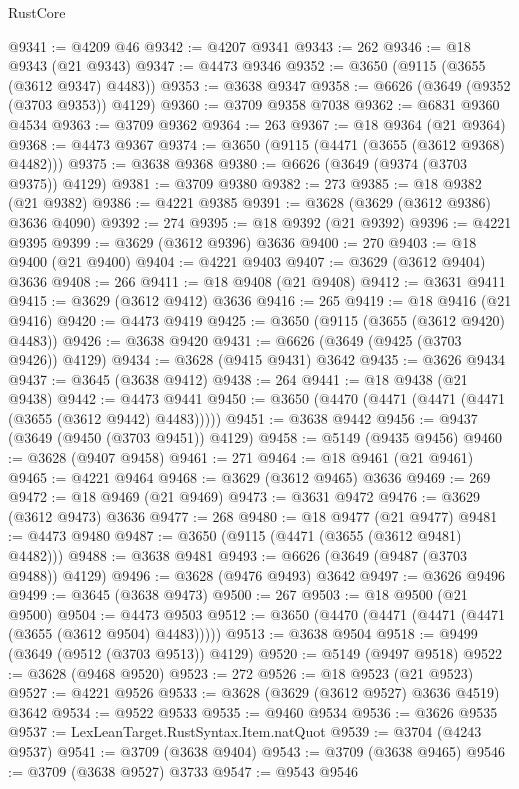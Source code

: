 \begin{lexlean}{RustCore}
\begin{coremodule}
@9341 := @4209 @46
@9342 := @4207 @9341
@9343 := 262
@9346 := @18 @9343 (@21 @9343)
@9347 := @4473 @9346
@9352 := @3650 (@9115 (@3655 (@3612 @9347) @4483))
@9353 := @3638 @9347
@9358 := @6626 (@3649 (@9352 (@3703 @9353)) @4129)
@9360 := @3709 @9358 @7038
@9362 := @6831 @9360 @4534
@9363 := @3709 @9362
@9364 := 263
@9367 := @18 @9364 (@21 @9364)
@9368 := @4473 @9367
@9374 := @3650 (@9115 (@4471 (@3655 (@3612 @9368) @4482)))
@9375 := @3638 @9368
@9380 := @6626 (@3649 (@9374 (@3703 @9375)) @4129)
@9381 := @3709 @9380
@9382 := 273
@9385 := @18 @9382 (@21 @9382)
@9386 := @4221 @9385
@9391 := @3628 (@3629 (@3612 @9386) @3636 @4090)
@9392 := 274
@9395 := @18 @9392 (@21 @9392)
@9396 := @4221 @9395
@9399 := @3629 (@3612 @9396) @3636
@9400 := 270
@9403 := @18 @9400 (@21 @9400)
@9404 := @4221 @9403
@9407 := @3629 (@3612 @9404) @3636
@9408 := 266
@9411 := @18 @9408 (@21 @9408)
@9412 := @3631 @9411
@9415 := @3629 (@3612 @9412) @3636
@9416 := 265
@9419 := @18 @9416 (@21 @9416)
@9420 := @4473 @9419
@9425 := @3650 (@9115 (@3655 (@3612 @9420) @4483))
@9426 := @3638 @9420
@9431 := @6626 (@3649 (@9425 (@3703 @9426)) @4129)
@9434 := @3628 (@9415 @9431) @3642
@9435 := @3626 @9434
@9437 := @3645 (@3638 @9412)
@9438 := 264
@9441 := @18 @9438 (@21 @9438)
@9442 := @4473 @9441
@9450 := @3650 (@4470 (@4471 (@4471 (@4471 (@3655 (@3612 @9442) @4483)))))
@9451 := @3638 @9442
@9456 := @9437 (@3649 (@9450 (@3703 @9451)) @4129)
@9458 := @5149 (@9435 @9456)
@9460 := @3628 (@9407 @9458)
@9461 := 271
@9464 := @18 @9461 (@21 @9461)
@9465 := @4221 @9464
@9468 := @3629 (@3612 @9465) @3636
@9469 := 269
@9472 := @18 @9469 (@21 @9469)
@9473 := @3631 @9472
@9476 := @3629 (@3612 @9473) @3636
@9477 := 268
@9480 := @18 @9477 (@21 @9477)
@9481 := @4473 @9480
@9487 := @3650 (@9115 (@4471 (@3655 (@3612 @9481) @4482)))
@9488 := @3638 @9481
@9493 := @6626 (@3649 (@9487 (@3703 @9488)) @4129)
@9496 := @3628 (@9476 @9493) @3642
@9497 := @3626 @9496
@9499 := @3645 (@3638 @9473)
@9500 := 267
@9503 := @18 @9500 (@21 @9500)
@9504 := @4473 @9503
@9512 := @3650 (@4470 (@4471 (@4471 (@4471 (@3655 (@3612 @9504) @4483)))))
@9513 := @3638 @9504
@9518 := @9499 (@3649 (@9512 (@3703 @9513)) @4129)
@9520 := @5149 (@9497 @9518)
@9522 := @3628 (@9468 @9520)
@9523 := 272
@9526 := @18 @9523 (@21 @9523)
@9527 := @4221 @9526
@9533 := @3628 (@3629 (@3612 @9527) @3636 @4519) @3642
@9534 := @9522 @9533
@9535 := @9460 @9534
@9536 := @3626 @9535
@9537 := LexLeanTarget.RustSyntax.Item.natQuot
@9539 := @3704 (@4243 @9537)
@9541 := @3709 (@3638 @9404)
@9543 := @3709 (@3638 @9465)
@9546 := @3709 (@3638 @9527) @3733
@9547 := @9543 @9546

\end{coremodule}
\end{lexlean}
